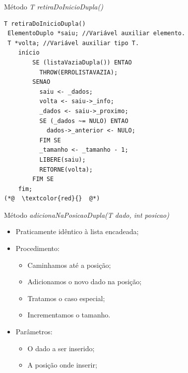 \documentclass[12pt,table,xcolor={dvipsnames}]{beamer}
\begin{document}
\begin{frame}[fragile]{Método \textit{T retiraDoInicioDupla()}}
\begin{lstlisting}
T retiraDoInicioDupla()
 ElementoDuplo *saiu; //Variável auxiliar elemento.
 T *volta; //Variável auxiliar tipo T.
	início
		SE (listaVaziaDupla()) ENTAO
		  THROW(ERROLISTAVAZIA);
		SENAO
		  saiu <- _dados;
		  volta <- saiu->_info;
		  _dados <- saiu->_proximo;
		  SE (_dados ~= NULO) ENTAO
			dados->_anterior <- NULO;
		  FIM SE
		  _tamanho <- _tamanho - 1;
		  LIBERE(saiu);
		  RETORNE(volta);
		FIM SE
	fim;
(*@  \textcolor{red}{}  @*)
\end{lstlisting}
\end{frame}

\begin{frame}[fragile]{Método \textit{adicionaNaPosicaoDupla(T dado, int posicao)}}

\begin{itemize}
\item Praticamente idêntico à lista encadeada;
\item Procedimento:
\begin{itemize}
\item Caminhamos até a posição;
\item Adicionamos o novo dado na posição;
\item Tratamos o caso especial;
\item Incrementamos o tamanho.
\end{itemize}
\item Parâmetros:
\begin{itemize}
\item O dado a ser inserido;
\item A posição onde inserir;
\end{itemize}
\end{itemize}
\end{frame}
\end{document}

